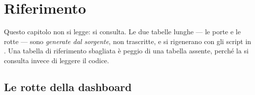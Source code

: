 \chapter{Riferimento}\label{cap:riferimento}

Questo capitolo non si legge: si consulta. Le due tabelle lunghe --- le porte
e le rotte --- sono \emph{generate dal sorgente}, non trascritte, e si
rigenerano con gli script in . Una tabella di riferimento
sbagliata è peggio di una tabella assente, perché la si consulta invece di
leggere il codice.





\section{Le rotte della dashboard}\label{sez:rotte-tabella}


